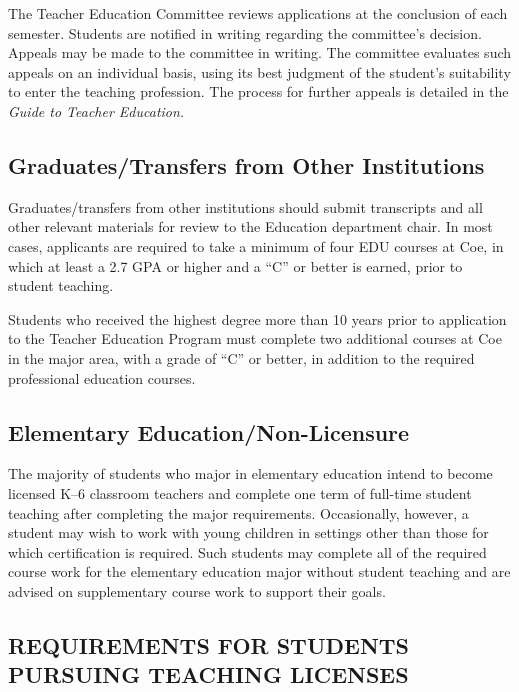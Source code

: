 \documentclass[
  letterpaper,
]{scrbook}
\begin{document}
The Teacher Education Committee reviews applications at the conclusion
of each semester. Students are notified in writing regarding the
committee's decision. Appeals may be made to the committee in writing.
The committee evaluates such appeals on an individual basis, using its
best judgment of the student's suitability to enter the teaching
profession. The process for further appeals is detailed in the
\emph{Guide to Teacher Education.}

\subsection{Graduates/Transfers from Other
Institutions}\label{graduatestransfers-from-other-institutions}

Graduates/transfers from other institutions should submit transcripts
and all other relevant materials for review to the Education department
chair. In most cases, applicants are required to take a minimum of four
EDU courses at Coe, in which at least a 2.7 GPA or higher and a ``C'' or
better is earned, prior to student teaching.

Students who received the highest degree more than 10 years prior to
application to the Teacher Education Program must complete two
additional courses at Coe in the major area, with a grade of ``C'' or
better, in addition to the required professional education courses.

\subsection{Elementary
Education/Non-Licensure}\label{elementary-educationnon-licensure}

The majority of students who major in elementary education intend to
become licensed K--6 classroom teachers and complete one term of
full-time student teaching after completing the major requirements.
Occasionally, however, a student may wish to work with young children in
settings other than those for which certification is required. Such
students may complete all of the required course work for the elementary
education major without student teaching and are advised on
supplementary course work to support their goals.

\subsection{REQUIREMENTS FOR STUDENTS PURSUING TEACHING
LICENSES}\label{requirements-for-students-pursuing-teaching-licenses}
\end{document}
